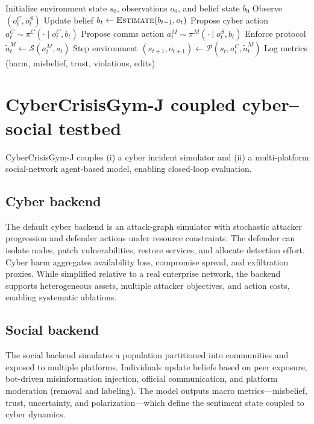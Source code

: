 \documentclass[sn-basic]{sn-jnl}
\newcommand{\model}{V-CHIMERA}
\newcommand{\envname}{CyberCrisisGym-J}
\begin{document}
\begin{algorithm}[t]
\caption{\model{} closed-loop step (single episode)}
\label{alg:step}
\begin{algorithmic}[1]
\State Initialize environment state $s_0$, observations $o_0$, and belief state $b_0$
  \State Observe $(o^C_t, o^S_t)$
  \State Update belief $b_t \leftarrow \textsc{Estimate}(b_{t-1}, o_t)$
  \State Propose cyber action $a^C_t \sim \pi^C(\cdot \mid o^C_t, b_t)$
  \State Propose comms action $a^M_t \sim \pi^M(\cdot \mid o^S_t, b_t)$
  \State Enforce protocol $\tilde a^M_t \leftarrow \mathcal{S}(a^M_t, s_t)$
  \State Step environment $(s_{t+1}, o_{t+1}) \leftarrow \mathcal{P}(s_t, a^C_t, \tilde a^M_t)$
  \State Log metrics (harm, misbelief, trust, violations, edits)
\EndFor
\end{algorithmic}
\end{algorithm}

\section{\envname{} coupled cyber--social testbed}
\envname{} couples (i) a cyber incident simulator and (ii) a multi-platform social-network agent-based model, enabling closed-loop evaluation.

\subsection{Cyber backend}
The default cyber backend is an attack-graph simulator with stochastic attacker progression and defender actions under resource constraints. The defender can isolate nodes, patch vulnerabilities, restore services, and allocate detection effort. Cyber harm aggregates availability loss, compromise spread, and exfiltration proxies. While simplified relative to a real enterprise network, the backend supports heterogeneous assets, multiple attacker objectives, and action costs, enabling systematic ablations.

\subsection{Social backend}
The social backend simulates a population partitioned into communities and exposed to multiple platforms. Individuals update beliefs based on peer exposure, bot-driven misinformation injection, official communication, and platform moderation (removal and labeling). The model outputs macro metrics---misbelief, trust, uncertainty, and polarization---which define the sentiment state coupled to cyber dynamics.
\end{document}
